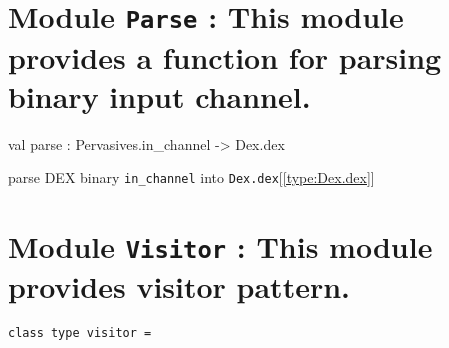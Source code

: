 \documentclass[11pt]{article}
\begin{document}
\section{Module {\tt{Parse}} : This module provides a function for parsing binary input channel.}
\label{module:Parse}




\ocamldocvspace{0.5cm}



\label{val:Parse.parse}\begin{ocamldoccode}
val parse : Pervasives.in_channel -> Dex.dex
\end{ocamldoccode}
\begin{ocamldocdescription}
parse DEX binary {\tt{in\_channel}} into {\tt{Dex.dex}}[\ref{type:Dex.dex}]


\end{ocamldocdescription}


\section{Module {\tt{Visitor}} : This module provides visitor pattern.}
\label{module:Visitor}




\ocamldocvspace{0.5cm}



\begin{ocamldoccode}
{\tt{class type visitor = }}\end{ocamldoccode}
\label{classtype:Visitor.visitor}
\end{document}

